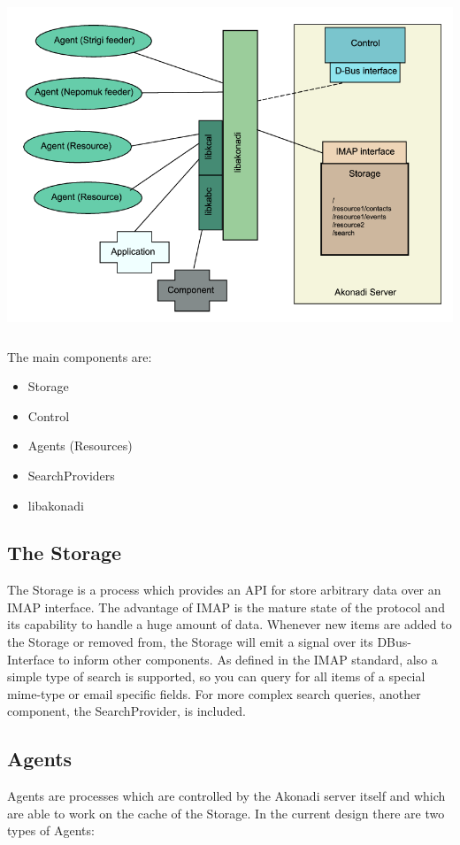 \documentclass[]{report}
\begin{document}
\begin{center}
\includegraphics[height=10cm]{pics/concept.png}
\end{center}

The main components are:
\begin{itemize}
  \item Storage
  \item Control
  \item Agents (Resources)
  \item SearchProviders
  \item libakonadi
\end{itemize}

\subsection{The Storage}
The Storage is a process which provides an API for store arbitrary data over
an IMAP interface. The advantage of IMAP is the mature state of the protocol
and its capability to handle a huge amount of data.
Whenever new items are added to the Storage or removed from, the Storage will
emit a signal over its DBus-Interface to inform other components.
As defined in the IMAP standard, also a simple type of search is supported,
so you can query for all items of a special mime-type or email specific fields.
For more complex search queries, another component, the SearchProvider, is included.

\subsection{Agents}
Agents are processes which are controlled by the Akonadi server itself and which
are able to work on the cache of the Storage. In the current design there are two
types of Agents:
\end{document}
